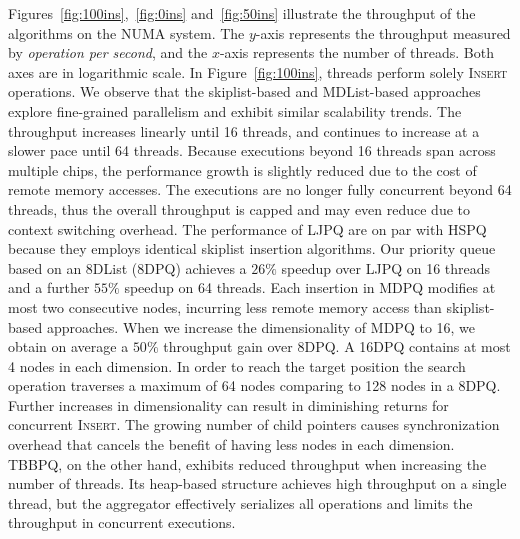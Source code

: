 \documentclass[10pt,journal,letterpaper,compsoc]{IEEEtran}
\begin{document}
Figures~\ref{fig:100ins},~\ref{fig:0ins} and~\ref{fig:50ins} illustrate the throughput of the algorithms on the NUMA system.
The $y$-axis represents the throughput measured by \emph{operation per second}, and the $x$-axis represents the number of threads.
Both axes are in logarithmic scale.
In Figure~\ref{fig:100ins}, threads perform solely \textsc{Insert} operations.
We observe that the skiplist-based and MDList-based approaches explore fine-grained parallelism and exhibit similar scalability trends.
The throughput increases linearly until 16 threads, and continues to increase at a slower pace until 64 threads.
Because executions beyond 16 threads span across multiple chips, the performance growth is slightly reduced due to the cost of remote memory accesses.
The executions are no longer fully concurrent beyond 64 threads, thus the overall throughput is capped and may even reduce due to context switching overhead.
The performance of LJPQ are on par with HSPQ because they employs identical skiplist insertion algorithms.
Our priority queue based on an 8DList (8DPQ) achieves a $26\%$ speedup over LJPQ on 16 threads and a further $55\%$ speedup on 64 threads.
Each insertion in MDPQ modifies at most two consecutive nodes, incurring less remote memory access than skiplist-based approaches.
When we increase the dimensionality of MDPQ to 16, we obtain on average a $50\%$ throughput gain over 8DPQ.
A 16DPQ contains at most 4 nodes in each dimension.
In order to reach the target position the search operation traverses a maximum of 64 nodes comparing to 128 nodes in a 8DPQ.
Further increases in dimensionality can result in diminishing returns for concurrent \textsc{Insert}.
The growing number of child pointers causes synchronization overhead that cancels the benefit of having less nodes in each dimension.
TBBPQ, on the other hand, exhibits reduced throughput when increasing the number of threads.
Its heap-based structure achieves high throughput on a single thread, but the aggregator effectively serializes all operations and limits the throughput in concurrent executions.
\end{document}
